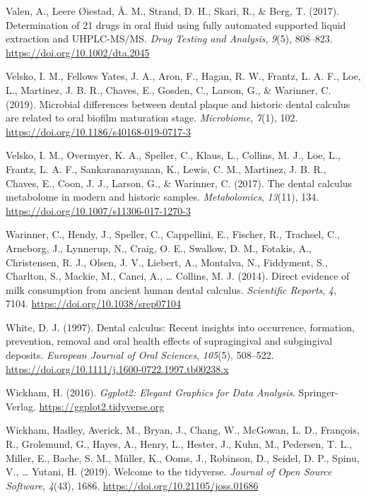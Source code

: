 \documentclass[
]{article}
\newlength{\cslhangindent}
\newlength{\cslentryspacingunit} %
\newenvironment{CSLReferences}[2] %
 {%
  \setlength{\parindent}{0pt}
  \ifodd #1
  \let\oldpar\par
  \def\par{\hangindent=\cslhangindent\oldpar}
  \fi
  \setlength{\parskip}{#2\cslentryspacingunit}
 }%
 {}
\begin{document}
\begin{CSLReferences}{1}{0}
\leavevmode{}%
Valen, A., Leere Øiestad, Å. M., Strand, D. H., Skari, R., \& Berg, T.
(2017). Determination of 21 drugs in oral fluid using fully automated
supported liquid extraction and {UHPLC-MS}/{MS}. \emph{Drug Testing and
Analysis}, \emph{9}(5), 808--823. \url{https://doi.org/10.1002/dta.2045}

\leavevmode{}%
Velsko, I. M., Fellows Yates, J. A., Aron, F., Hagan, R. W., Frantz, L.
A. F., Loe, L., Martinez, J. B. R., Chaves, E., Gosden, C., Larson, G.,
\& Warinner, C. (2019). Microbial differences between dental plaque and
historic dental calculus are related to oral biofilm maturation stage.
\emph{Microbiome}, \emph{7}(1), 102.
\url{https://doi.org/10.1186/s40168-019-0717-3}

\leavevmode{}%
Velsko, I. M., Overmyer, K. A., Speller, C., Klaus, L., Collins, M. J.,
Loe, L., Frantz, L. A. F., Sankaranarayanan, K., Lewis, C. M., Martinez,
J. B. R., Chaves, E., Coon, J. J., Larson, G., \& Warinner, C. (2017).
The dental calculus metabolome in modern and historic samples.
\emph{Metabolomics}, \emph{13}(11), 134.
\url{https://doi.org/10.1007/s11306-017-1270-3}

\leavevmode{}%
Warinner, C., Hendy, J., Speller, C., Cappellini, E., Fischer, R.,
Trachsel, C., Arneborg, J., Lynnerup, N., Craig, O. E., Swallow, D. M.,
Fotakis, A., Christensen, R. J., Olsen, J. V., Liebert, A., Montalva,
N., Fiddyment, S., Charlton, S., Mackie, M., Canci, A., \ldots{}
Collins, M. J. (2014). Direct evidence of milk consumption from ancient
human dental calculus. \emph{Scientific Reports}, \emph{4}, 7104.
\url{https://doi.org/10.1038/srep07104}

\leavevmode{}%
White, D. J. (1997). Dental calculus: Recent insights into occurrence,
formation, prevention, removal and oral health effects of supragingival
and subgingival deposits. \emph{European Journal of Oral Sciences},
\emph{105}(5), 508--522.
\url{https://doi.org/10.1111/j.1600-0722.1997.tb00238.x}

\leavevmode{}%
Wickham, H. (2016). \emph{Ggplot2: {Elegant Graphics} for {Data
Analysis}}. {Springer-Verlag}. \url{https://ggplot2.tidyverse.org}

\leavevmode{}%
Wickham, Hadley, Averick, M., Bryan, J., Chang, W., McGowan, L. D.,
François, R., Grolemund, G., Hayes, A., Henry, L., Hester, J., Kuhn, M.,
Pedersen, T. L., Miller, E., Bache, S. M., Müller, K., Ooms, J.,
Robinson, D., Seidel, D. P., Spinu, V., \ldots{} Yutani, H. (2019).
Welcome to the {tidyverse}. \emph{Journal of Open Source Software},
\emph{4}(43), 1686. \url{https://doi.org/10.21105/joss.01686}


\end{CSLReferences}
\end{document}
